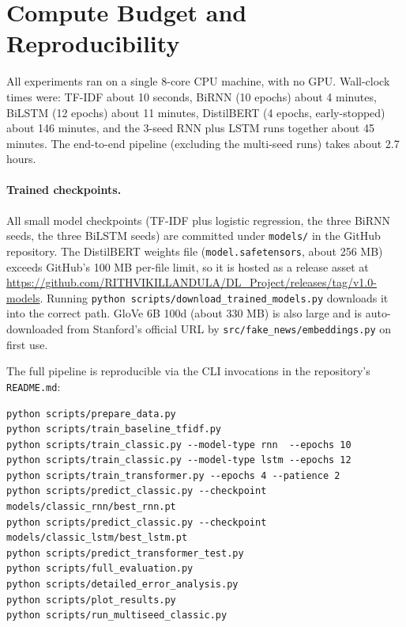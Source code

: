 \documentclass{article}
\begin{document}




\appendix

\section{Compute Budget and Reproducibility}\label{app:compute}

All experiments ran on a single 8-core CPU machine, with no GPU. Wall-clock times were: TF-IDF about 10 seconds, BiRNN (10 epochs) about 4 minutes, BiLSTM (12 epochs) about 11 minutes, DistilBERT (4 epochs, early-stopped) about 146 minutes, and the 3-seed RNN plus LSTM runs together about 45 minutes. The end-to-end pipeline (excluding the multi-seed runs) takes about 2.7 hours.

\paragraph{Trained checkpoints.} All small model checkpoints (TF-IDF plus logistic regression, the three BiRNN seeds, the three BiLSTM seeds) are committed under \texttt{models/} in the GitHub repository. The DistilBERT weights file (\texttt{model.safetensors}, about 256 MB) exceeds GitHub's 100 MB per-file limit, so it is hosted as a release asset at \url{https://github.com/RITHVIKILLANDULA/DL_Project/releases/tag/v1.0-models}. Running \texttt{python scripts/download\_trained\_models.py} downloads it into the correct path. GloVe 6B 100d (about 330 MB) is also large and is auto-downloaded from Stanford's official URL by \texttt{src/fake\_news/embeddings.py} on first use.

The full pipeline is reproducible via the CLI invocations in the repository's \texttt{README.md}:

\begin{verbatim}
python scripts/prepare_data.py
python scripts/train_baseline_tfidf.py
python scripts/train_classic.py --model-type rnn  --epochs 10
python scripts/train_classic.py --model-type lstm --epochs 12
python scripts/train_transformer.py --epochs 4 --patience 2
python scripts/predict_classic.py --checkpoint models/classic_rnn/best_rnn.pt
python scripts/predict_classic.py --checkpoint models/classic_lstm/best_lstm.pt
python scripts/predict_transformer_test.py
python scripts/full_evaluation.py
python scripts/detailed_error_analysis.py
python scripts/plot_results.py
python scripts/run_multiseed_classic.py
\end{verbatim}
\end{document}
